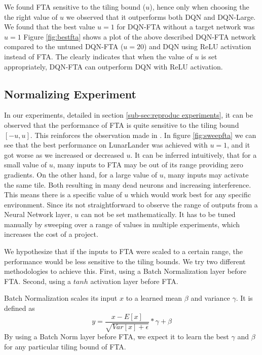 \documentclass{article}
\begin{document}
We found FTA sensitive to the tiling bound ($u$), hence only when choosing the the right value of $u$ we observed that it outperforms both DQN and DQN-Large.
We found that the best value $u=1$ for DQN-FTA without a target network was $u=1$
Figure \ref{fig:bestfta} shows a plot of the above described DQN-FTA network compared to the untuned DQN-FTA ($u=20$) and DQN using ReLU activation instead of FTA.
The clearly indicates that when the value of $u$ is set appropriately, DQN-FTA can outperform DQN with ReLU activation.

\subsection{Normalizing Experiment} \label{sub-sec:normalize experiments}
In our experiments, detailed in section \ref{sub-sec:reproduc experiments}, it can be observed that the performance of FTA is quite sensitive to the tiling bound $[-u, u]$.
This reinforces the observation made in \cite{pan2019fuzzy}.
In figure \ref{fig:sweepfta} we can see that the best performance on LunarLander was achieved with $u=1$, and it got worse as we increased or decreased $u$.
It can be inferred intuitively, that for a small value of $u$, many inputs to FTA may be out of its range providing zero gradients.
On the other hand, for a large value of $u$, many inputs may activate the same tile.
Both resulting in many dead neurons and increasing interference.
This means there is a specific value of $u$ which would work best for any specific environment.
Since its not straightforward to observe the range of outputs from a Neural Network layer, $u$ can not be set mathematically.
It has to be tuned manually by sweeping over a range of values in multiple experiments, which increases the cost of a project.

We hypothesize that if the inputs to FTA were scaled to a certain range, the performance would be less sensitive to the tiling bounds.
We try two different methodologies to achieve this.
First, using a Batch Normalization \cite[]{ioffe2015batch} layer before FTA.
Second, using a $tanh$ activation layer before FTA.

Batch Normalization scales its input $x$ to a learned mean $\beta$ and variance $\gamma$.
It is defined as
\begin{equation}
    y = \frac{x-E[x]}{\sqrt{Var[x] + \epsilon}} * \gamma + \beta
    \label{eq:batchnorm}
\end{equation}
By using a Batch Norm layer before FTA, we expect it to learn the best $\gamma$ and $\beta$ for any particular tiling bound of FTA.
\end{document}
